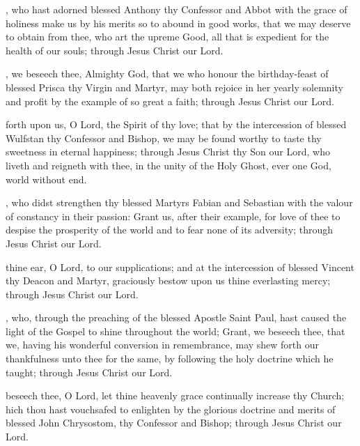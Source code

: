 , who hast adorned blessed Anthony thy Confessor and Abbot with the grace of holiness make us by his merits so to abound in good works, that we may deserve to obtain from thee, who art the upreme Good, all that is expedient for the health of our souls; through Jesus Christ our Lord.

, we beseech thee, Almighty God, that we who honour the birthday-feast of blessed Prisca thy Virgin and Martyr, may both rejoice in her yearly solemnity and profit by the example of so great a faith; through Jesus Christ our Lord.

 forth upon us, O Lord, the Spirit of thy love; that by the intercession of blessed Wulfstan thy Confessor and Bishop, we may be found worthy to taste thy sweetness in eternal happiness; through Jesus Christ thy Son our Lord, who liveth and reigneth with thee, in the unity of the Holy Ghost, ever one God, world without end.

, who didst strengthen thy blessed Martyrs Fabian and Sebastian with the valour of constancy in their passion: Grant us, after their example, for love of thee to despise the prosperity of the world and to fear none of its adversity; through Jesus Christ our Lord.

 thine ear, O Lord, to our supplications; and at the intercession of blessed Vincent thy Deacon and Martyr, graciously bestow upon us thine everlasting mercy; through Jesus Christ our Lord.

, who, through the preaching of the blessed Apostle Saint Paul, hast caused the light of the Gospel to shine throughout the world; Grant, we beseech thee, that we, having his wonderful conversion in remembrance, may shew forth our thankfulness unto thee for the same, by following the holy doctrine which he taught; through Jesus Christ our Lord.

 beseech thee, O Lord, let thine heavenly grace continually increase thy Church; hich thou hast vouchsafed to enlighten by the glorious doctrine and merits of blessed John Chrysostom, thy Confessor and Bishop; through Jesus Christ our Lord.

